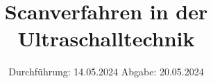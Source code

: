 

\subject{US2}
\title{Scanverfahren in der Ultraschalltechnik}
\date{%
  Durchführung: 14.05.2024
  \hspace{3em}
  Abgabe: 20.05.2024
}



\maketitle
\thispagestyle{empty}
\tableofcontents
\newpage






\printbibliography{}


